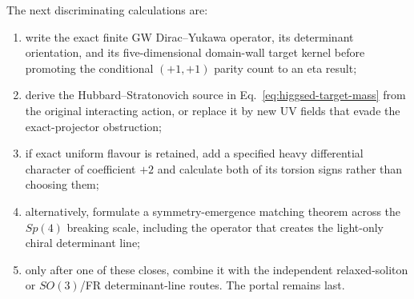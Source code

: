 \documentclass[11pt]{article}
\theoremstyle{definition}
\theoremstyle{remark}
\begin{document}
The next discriminating calculations are:
\begin{enumerate}
\item write the exact finite GW Dirac--Yukawa operator, its determinant
  orientation, and its five-dimensional domain-wall target kernel before
  promoting the conditional \((+1,+1)\) parity count to an eta result;
\item derive the Hubbard--Stratonovich source in
  Eq.~\eqref{eq:higgsed-target-mass} from the original interacting action,
  or replace it by new UV fields that evade the exact-projector obstruction;
\item if exact uniform flavour is retained, add a specified heavy
  differential character of coefficient \(+2\) and calculate both of its
  torsion signs rather than choosing them;
\item alternatively, formulate a symmetry-emergence matching theorem across
  the \(Sp(4)\) breaking scale, including the operator that creates the
  light-only chiral determinant line;
\item only after one of these closes, combine it with the independent
  relaxed-soliton or \(SO(3)\)/FR determinant-line routes.  The portal remains
  last.
\end{enumerate}



\end{document}
